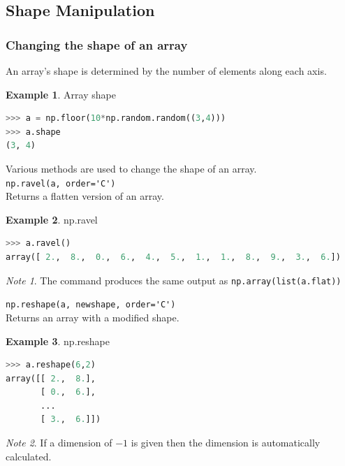 \documentclass{article}
\theoremstyle{definition}
\newtheorem{ex}{Example}[subsection]
\theoremstyle{remark}
\newtheorem*{nb}{Note}
\newcommand{\func}[2]{\noindent\lstinline{#1}\\#2}
\begin{document}
\break


\subsection{Shape Manipulation}

\subsubsection{Changing the shape of an array}

An array's shape is determined by the number of elements along each axis.

\begin{ex}Array shape
\begin{lstlisting}[language=Python]
>>> a = np.floor(10*np.random.random((3,4)))
>>> a.shape
(3, 4)
\end{lstlisting}
\end{ex}

\noindent Various methods are used to change the shape of an array.\\


\func{np.ravel(a, order='C')}{Returns a flatten version of an array.}

\begin{ex} np.ravel
\begin{lstlisting}[language=Python]
>>> a.ravel()
array([ 2.,  8.,  0.,  6.,  4.,  5.,  1.,  1.,  8.,  9.,  3.,  6.])
\end{lstlisting}
\end{ex}


\begin{nb}
    The command produces the same output as \lstinline{np.array(list(a.flat))}\\
\end{nb}


\func{np.reshape(a, newshape, order='C')}{Returns an array with a modified shape.}

\begin{ex} np.reshape
\begin{lstlisting}[language=Python]
>>> a.reshape(6,2)
array([[ 2.,  8.],
       [ 0.,  6.],
       ...
       [ 3.,  6.]])
\end{lstlisting}
\end{ex}

\begin{nb}
If a dimension of $ -1 $ is given then the dimension is automatically calculated.\\
\end{nb}
\end{document}
